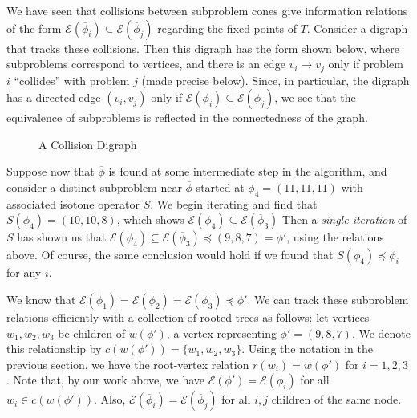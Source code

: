\documentclass[11pt,reqno]{amsart}
\theoremstyle{definition}
\numberwithin{equation}{section}
\newcommand{\ol}{\overline}
\newcommand{\pre}{\phi}
\newcommand{\sub}{\subseteq}
\newcommand{\fix}{\mathcal{E}}
\newcommand{\peq}{\preceq}
\newcommand{\toppre}{\ol{\pre}}
\begin{document}
We have seen that collisions between subproblem cones give information relations of the form $\fix(\toppre_i) \sub \fix(\toppre_j)$ regarding the fixed points of $T$.
Consider a digraph that tracks these collisions.
Then this digraph has the form shown below, where subproblems correspond to vertices, and there is an edge $v_i \to v_j$ only if problem $i$ ``collides'' with problem $j$ (made precise below). 
Since, in particular, the digraph has a directed edge $(v_i,v_j)$ only if $\fix(\pre_i) \sub \fix(\pre_j)$, we see that the equivalence of subproblems is reflected in the connectedness of the graph. 

\begin{figure} \label{fig:digraph}
\caption{A Collision Digraph}
\end{figure}

Suppose now that $\toppre$ is found at some intermediate step in the algorithm, and consider a distinct subproblem near $\toppre$ started at $\pre_4 = (11,11,11)$ with associated isotone operator $S$.
We begin iterating and find that $S(\pre_4) = (10,10,8)$, which shows $\fix(\pre_4) \sub \fix(\toppre_3)$ 
Then a \emph{single iteration} of $S$ has shown us that $\fix(\pre_4) \sub \fix(\toppre_3) \peq (9,8,7) = \pre'$, using the relations above. 
Of course, the same conclusion would hold if we found that  $S(\pre_4) \peq \toppre_i$ for any $i$. 

We know that $\fix(\toppre_1) = \fix(\toppre_2) = \fix(\toppre_3) \peq \pre'$. 
We can track these subproblem relations efficiently with a collection of rooted trees as follows: let vertices $w_1,w_2,w_3$ be children of $w(\pre')$, a vertex representing $\pre' = (9,8,7)$. 
We denote this relationship by $c(w(\pre')) = \{w_1,w_2,w_3\}$.
Using the notation in the previous section, we have the root-vertex relation $r(w_i) = w(\pre')$ for $i = 1,2,3$. 
Note that, by our work above, we have $\fix(\pre') = \fix(\toppre_i)$ for all $w_i \in c(w(\pre'))$. 
Also, $\fix(\toppre_i) = \fix(\toppre_j)$ for all $i,j$ children of the same node. 
\end{document}
